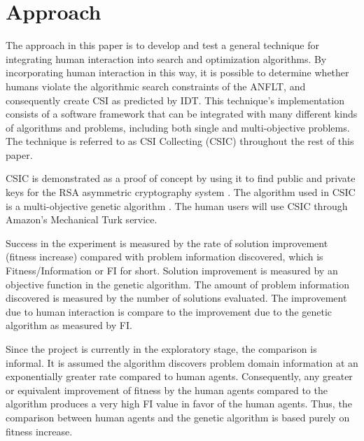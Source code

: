 \section{Approach}\label{sec:solution-approach}

The approach in this paper is to develop and test a general technique for integrating  human interaction into search and optimization algorithms.  By incorporating human interaction in this way, it is possible to determine whether humans violate the algorithmic search constraints of the ANFLT, and consequently create CSI as predicted by IDT.  This technique's implementation consists of a software framework that can be integrated with many different kinds of algorithms and problems, including both single and multi-objective problems.  The technique is referred to as  CSI Collecting (CSIC) throughout the rest of this paper.

CSIC is demonstrated as a proof of concept by using it to find public and private keys for the 
RSA 
asymmetric cryptography system 
\citep{cormen01:_introd_to_algor}.  The algorithm used in CSIC is a multi-objective genetic algorithm .  The human users will use CSIC through Amazon's Mechanical Turk service.  

   Success in the experiment is measured by the rate of solution improvement (fitness increase) compared with problem information discovered, which is Fitness/Information or FI for short.  Solution improvement is measured by an objective function in the genetic algorithm.  The amount of problem information discovered is measured by the number of solutions evaluated.  The improvement due to human interaction is compare to the improvement due to the genetic algorithm as measured by FI.  

Since the project is currently in the exploratory stage, the comparison is informal.  It is assumed the algorithm discovers problem domain information at an exponentially greater rate compared to human agents.  Consequently, any greater or equivalent improvement of fitness by the human agents compared to the algorithm produces a very high FI value in favor of the human agents.  Thus, the comparison between human agents and the genetic algorithm is based purely on fitness increase.

